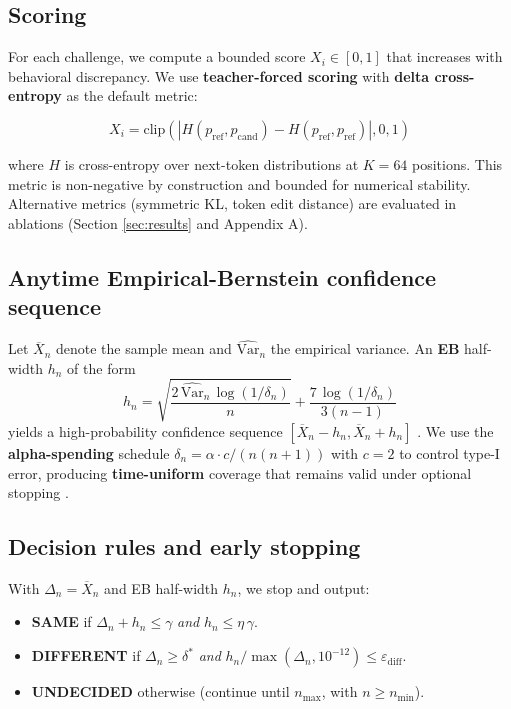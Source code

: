 \documentclass{article}
\begin{document}
\subsection{Scoring}

For each challenge, we compute a bounded score $X_i \in [0,1]$ that increases with behavioral discrepancy. We use \textbf{teacher-forced scoring} with \textbf{delta cross-entropy} as the default metric:

\[X_i = \text{clip}(|H(p_{\text{ref}}, p_{\text{cand}}) - H(p_{\text{ref}}, p_{\text{ref}})|, 0, 1)\]

where $H$ is cross-entropy over next-token distributions at $K=64$ positions. This metric is non-negative by construction and bounded for numerical stability. Alternative metrics (symmetric KL, token edit distance) are evaluated in ablations (Section \ref{sec:results} and Appendix A).

\subsection{Anytime Empirical-Bernstein confidence sequence}

Let $\overline{X}_n$ denote the sample mean and $\widehat{\mathrm{Var}}_n$ the empirical variance. An \textbf{EB} half-width $h_n$ of the form
\[
h_n = \sqrt{\frac{2\,\widehat{\mathrm{Var}}_n\,\log(1/\delta_n)}{n}} + \frac{7\,\log(1/\delta_n)}{3(n-1)}
\]
yields a high-probability confidence sequence $[\overline{X}_n - h_n, \overline{X}_n + h_n]$ \cite{maurer2009empiricalbernstein}. We use the \textbf{alpha-spending} schedule $\delta_n = \alpha \cdot c/(n(n+1))$ with $c = 2$ to control type-I error, producing \textbf{time-uniform} coverage that remains valid under optional stopping \cite{howard2021timeuniform}.

\subsection{Decision rules and early stopping}

With $\Delta_n = \overline{X}_n$ and EB half-width $h_n$, we stop and output:
\begin{itemize}
\item \textbf{SAME} if $\Delta_n + h_n \le \gamma$ \emph{and} $h_n \le \eta \,\gamma$.
\item \textbf{DIFFERENT} if $\Delta_n \ge \delta^*$ \emph{and} $h_n/\max(\Delta_n,10^{-12}) \le \varepsilon_{\text{diff}}$.
\item \textbf{UNDECIDED} otherwise (continue until $n_{\max}$, with $n \ge n_{\min}$).
\end{itemize}
\end{document}
